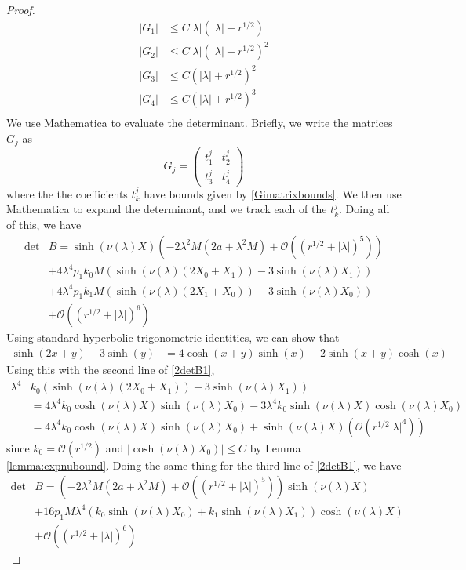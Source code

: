 \documentclass[thesis.tex]{subfiles}
\begin{document}
\begin{lemma}
\begin{proof}
\begin{equation}
\begin{aligned}
|G_1| &\leq C |\lambda| (|\lambda| + r^{1/2} )\\
|G_2| &\leq C |\lambda| (|\lambda| + r^{1/2} )^2 \\
|G_3| &\leq C (|\lambda| + r^{1/2} )^2 \\
|G_4| &\leq C (|\lambda| + r^{1/2} )^3 \\
\end{aligned}
\end{equation}
We use Mathematica to evaluate the determinant. Briefly, we write the matrices $G_j$ as
\[
G_j = \begin{pmatrix}t^j_1 & t^j_2 \\ t^j_3 & t^j_4 \end{pmatrix}
\]
where the the coefficients $t^j_k$ have bounds given by \cref{Gimatrixbounds}. We then use Mathematica to expand the determinant, and we track each of the $t^j_k$. Doing all of this, we have
\begin{equation}\label{2detB1}
\begin{aligned}
\det &B = \sinh(\nu(\lambda)X)\left(-2 \lambda^2 M (2a + \lambda^2 M) +  \mathcal{O}( (r^{1/2} + |\lambda|)^5 )\right) \\
&+4\lambda^4 p_1 k_0 M \left( \sinh(\nu(\lambda)(2 X_0 + X_1)) - 3 \sinh(\nu(\lambda)X_1)  \right) \\
&+4\lambda^4 p_1 k_1 M \left( \sinh(\nu(\lambda)(2 X_1 + X_0)) - 3 \sinh(\nu(\lambda)X_0)  \right) \\
&+ \mathcal{O}( (r^{1/2} + |\lambda|)^6) 
\end{aligned}
\end{equation}
Using standard hyperbolic trigonometric identities, we can show that 
\begin{align*}
\sinh(2 x + y) - 3 \sinh(y) &= 4 \cosh(x + y)\sinh(x) 
-2 \sinh(x+y)\cosh(x) 
\end{align*}
Using this with the second line of \cref{2detB1}, 
\begin{align*}
\lambda^4 &k_0 \left( \sinh(\nu(\lambda)(2 X_0 + X_1)) - 3 \sinh(\nu(\lambda)X_1)  \right) \\
&= 4 \lambda^4 k_0 \cosh(\nu(\lambda)X)\sinh(\nu(\lambda)X_0) - 3 \lambda^4 k_0 \sinh(\nu(\lambda)X)\cosh(\nu(\lambda)X_0) \\
&= 4 \lambda^4 k_0 \cosh(\nu(\lambda)X)\sinh(\nu(\lambda)X_0) + \sinh(\nu(\lambda)X)(\mathcal{O}(r^{1/2}|\lambda|^4))
\end{align*}
since $k_0 = \mathcal{O}(r^{1/2})$ and $|\cosh(\nu(\lambda)X_0)|\leq C$ by Lemma \ref{lemma:expnubound}. Doing the same thing for the third line of \cref{2detB1}, we have
\begin{equation*}
\begin{aligned}
\det &B = \left(-2 \lambda^2 M (2a + \lambda^2 M) +  \mathcal{O}( (r^{1/2} + |\lambda|)^5 )\right) \sinh(\nu(\lambda)X) \\
&+16 p_1 M \lambda^4 ( k_0\sinh(\nu(\lambda)X_0) + k_1 \sinh(\nu(\lambda)X_1) ) \cosh(\nu(\lambda)X)  \\
&+ \mathcal{O}( (r^{1/2} + |\lambda|)^6) 
\end{aligned}
\end{equation*}


\end{proof}
\end{lemma}
\end{document}
